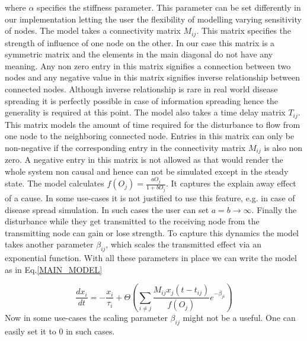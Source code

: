 \documentclass[11pt]{article}
\begin{document}
where $\alpha$ specifies the stiffness parameter. This parameter can be set differently in our implementation letting the user the flexibility of modelling varying sensitivity of nodes. The model takes a connectivity matrix $M_{ij}$. This matrix specifies the strength of influence of one node on the other. In our case this matrix is a symmetric matrix and the elements in the main diagonal do not have any meaning. Any non zero entry in this matrix signifies a connection between two nodes and any negative value in this matrix signifies inverse relationship between connected nodes. Although inverse relationship is rare in real world disease spreading it is perfectly possible in case of information spreading hence the generality is required at this point. The model also takes a time delay matrix $T_{ij}$. This matrix models the amount of time required for the disturbance to flow from one node to the neighboring connected node. Entries in this matrix can only be non-negative if the corresponding entry in the connectivity matrix $M_{ij}$ is also non zero. A negative entry in this matrix is not allowed as that would render the whole system non causal and hence can not be simulated except in the steady state. The model calculates $f(O_j) = \frac{aO_j}{1+bO_j}$. It captures the explain away effect of a cause. In some use-cases it is not justified to use this feature, e.g. in case of disease spread simulation. In such cases the user can set $a=b\rightarrow\infty$. Finally the disturbance while they get transmitted to the receiving node from the transmitting node can gain or lose strength. To capture this dynamics the model takes another parameter $\beta_{ij}$, which scales the transmitted effect via an exponential function. With all these parameters in place we can write the model as in Eq.\ref{MAIN_MODEL}

\begin{equation}
\frac{dx_i}{dt} = -\frac{x_i}{\tau_i}+\Theta\left(\sum_{i\ne j}{\frac{M_{ij}x_j(t-t_{ij})}{f(O_j)}e^{-\beta_{ji}}}\right) 
\label{MAIN_MODEL}
\end{equation}
Now in some use-cases the scaling parameter $\beta_{ij}$ might not be a useful. One can easily set it to $0$ in such cases.
\end{document}
